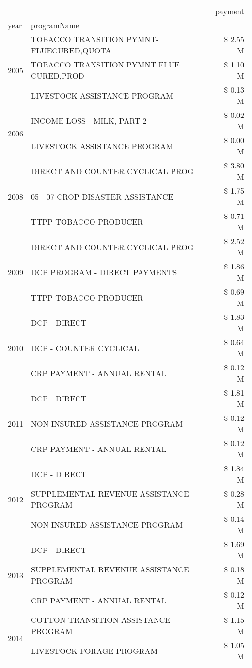 \begin{tabular}{llr}
\toprule
 &  & payment \\
year & programName &  \\
\midrule
\multirow[t]{3}{*}{2005} & TOBACCO TRANSITION PYMNT-FLUECURED,QUOTA & \$ 2.55 M \\
 & TOBACCO TRANSITION PYMNT-FLUE CURED,PROD & \$ 1.10 M \\
 & LIVESTOCK ASSISTANCE PROGRAM & \$ 0.13 M \\
\cline{1-3}
\multirow[t]{2}{*}{2006} & INCOME LOSS - MILK, PART 2 & \$ 0.02 M \\
 & LIVESTOCK ASSISTANCE PROGRAM & \$ 0.00 M \\
\cline{1-3}
\multirow[t]{3}{*}{2008} & DIRECT AND COUNTER CYCLICAL PROG & \$ 3.80 M \\
 & 05 - 07 CROP DISASTER ASSISTANCE & \$ 1.75 M \\
 & TTPP TOBACCO PRODUCER & \$ 0.71 M \\
\cline{1-3}
\multirow[t]{3}{*}{2009} & DIRECT AND COUNTER CYCLICAL PROG & \$ 2.52 M \\
 & DCP PROGRAM - DIRECT PAYMENTS & \$ 1.86 M \\
 & TTPP TOBACCO PRODUCER & \$ 0.69 M \\
\cline{1-3}
\multirow[t]{3}{*}{2010} & DCP - DIRECT & \$ 1.83 M \\
 & DCP - COUNTER CYCLICAL & \$ 0.64 M \\
 & CRP PAYMENT - ANNUAL RENTAL & \$ 0.12 M \\
\cline{1-3}
\multirow[t]{3}{*}{2011} & DCP - DIRECT & \$ 1.81 M \\
 & NON-INSURED ASSISTANCE PROGRAM & \$ 0.12 M \\
 & CRP PAYMENT - ANNUAL RENTAL & \$ 0.12 M \\
\cline{1-3}
\multirow[t]{3}{*}{2012} & DCP - DIRECT & \$ 1.84 M \\
 & SUPPLEMENTAL REVENUE ASSISTANCE PROGRAM & \$ 0.28 M \\
 & NON-INSURED ASSISTANCE PROGRAM & \$ 0.14 M \\
\cline{1-3}
\multirow[t]{3}{*}{2013} & DCP - DIRECT & \$ 1.69 M \\
 & SUPPLEMENTAL REVENUE ASSISTANCE PROGRAM & \$ 0.18 M \\
 & CRP PAYMENT - ANNUAL RENTAL & \$ 0.12 M \\
\cline{1-3}
\multirow[t]{3}{*}{2014} & COTTON TRANSITION ASSISTANCE PROGRAM & \$ 1.15 M \\
 & LIVESTOCK FORAGE PROGRAM & \$ 1.05 M \\

\end{tabular}
